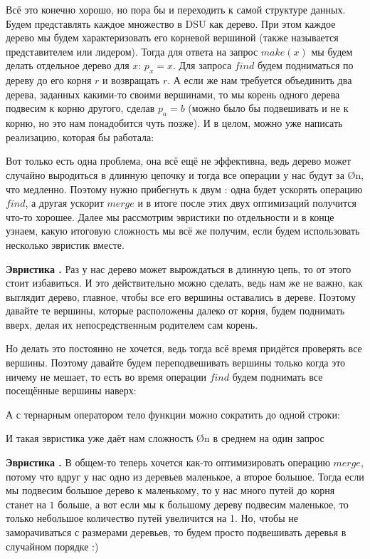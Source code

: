 Всё это конечно хорошо, но пора бы и переходить к самой структуре данных. Будем представлять каждое множество в DSU как дерево. При этом каждое дерево мы будем характеризовать его корневой вершиной (также называется представителем или лидером). Тогда для ответа на запрос $make(x)$ мы будем делать отдельное дерево для $x$: $p_x = x$. Для запроса $find$ будем подниматься по дереву до его корня $r$ и возвращать $r$. А если же нам требуется объединить два дерева, заданных какими-то своими вершинами, то мы корень одного дерева подвесим к корню другого, сделав $p_a = b$ (можно было бы подвешивать и не к корню, но это нам понадобится чуть позже). И в целом, можно уже написать реализацию, которая бы работала:

\nocode

Вот только есть одна проблема, она всё ещё не эффективна, ведь дерево может случайно выродиться в длинную цепочку и тогда все операции у нас будут за \O{n}, что медленно. Поэтому нужно прибегнуть к двум : одна будет ускорять операцию $find$, а другая ускорит $merge$ и в итоге после этих двух оптимизаций получится что-то хорошее. Далее мы рассмотрим эвристики по отдельности и в конце узнаем, какую итоговую сложность мы всё же получим, если будем использовать несколько эвристик вместе.

\textbf{Эвристика .} Раз у нас дерево может вырождаться в длинную цепь, то от этого стоит избавиться. И это действительно можно сделать, ведь нам же не важно, как выглядит дерево, главное, чтобы все его вершины оставались в дереве. Поэтому давайте те вершины, которые расположены далеко от корня, будем поднимать вверх, делая их непосредственным родителем сам корень.

Но делать это постоянно не хочется, ведь тогда всё время придётся проверять все вершины. Поэтому давайте будем переподвешивать вершины только когда это ничему не мешает, то есть во время операции $find$ будем поднимать все посещённые вершины наверх:

\nocode

А с тернарным оператором тело функции можно сократить до одной строки:

\nocode

И такая эвристика уже даёт нам сложность \O{\log n} в среднем на один запрос

\textbf{Эвристика .} В общем-то теперь хочется как-то оптимизировать операцию $merge$, потому что вдруг у нас одно из деревьев маленькое, а второе большое. Тогда если мы подвесим большое дерево к маленькому, то у нас много путей до корня станет на $1$ больше, а вот если мы к большому дереву подвесим маленькое, то только небольшое количество путей увеличится на 1. Но, чтобы не заморачиваться с размерами деревьев, то будем просто подвешивать деревья в случайном порядке :)

